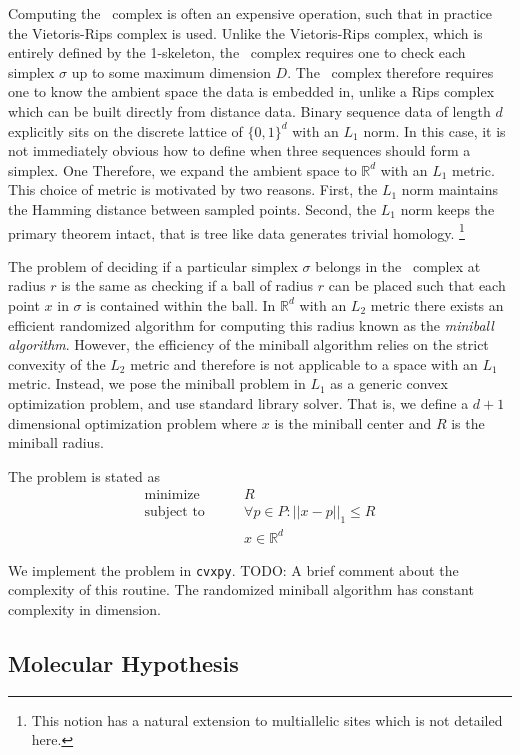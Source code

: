 Computing the \Cech\ complex is often an expensive operation, such that in practice the Vietoris-Rips complex is used.
Unlike the Vietoris-Rips complex, which is entirely defined by the 1-skeleton, the \Cech\ complex requires one to check each simplex $\sigma$ up to some maximum dimension $D$.
The \Cech\ complex therefore requires one to know the ambient space the data is embedded in, unlike a Rips complex which can be built directly from distance data.
Binary sequence data of length $d$ explicitly sits on the discrete lattice of $\{0,1\}^d$ with an $L_1$ norm.
In this case, it is not immediately obvious how to define when three sequences should form a simplex.
One
Therefore, we expand the ambient space to $\mathbb{R}^d$ with an $L_1$ metric.
This choice of metric is motivated by two reasons.
First, the $L_1$ norm maintains the Hamming distance between sampled points.
Second, the $L_1$ norm keeps the primary theorem intact, that is tree like data generates trivial homology.
\footnote{This notion has a natural extension to multiallelic sites which is not detailed here.}

The problem of deciding if a particular simplex $\sigma$ belongs in the \Cech\ complex at radius $r$ is the same as checking if a ball of radius $r$ can be placed such that each point $x$ in $\sigma$ is contained within the ball.
In $\mathbb{R}^d$ with an $L_2$ metric there exists an efficient randomized algorithm for computing this radius known as the \emph{miniball algorithm}.\autocite{Gartner:1999}
However, the efficiency of the miniball algorithm relies on the strict convexity of the $L_2$ metric and therefore is not applicable to a space with an $L_1$ metric.
Instead, we pose the miniball problem in $L_1$ as a generic convex optimization problem, and use standard library solver.
That is, we define a $d+1$ dimensional optimization problem where $x$ is the miniball center and $R$ is the miniball radius.

The problem is stated as
\begin{align*}
\text{minimize}\qquad   &  R \\
\text{subject to}\qquad & \forall p \in P: ||x-p||_{1} \leq R \\
                        & x \in \mathbb{R}^d
\end{align*}

We implement the problem in \texttt{cvxpy}.
TODO: A brief comment about the complexity of this routine.
The randomized miniball algorithm has constant complexity in dimension.

\subsection{Molecular Hypothesis}

